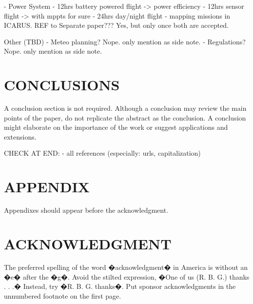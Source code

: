 \documentclass[letterpaper, 10 pt, conference]{ieeeconf}  %
\begin{document}
  - Power System
  - 12hrs battery powered flight -> power efficiency
  - 12hrs sensor flight -> with mppts for sure
  - 24hrs day/night flight
  - mapping missions in ICARUS. REF to Separate paper??? Yes, but only once both are accepted.
    
 Other (TBD)
  - Meteo planning? Nope. only mention as side note.
  - Regulations? Nope. only mention as side note.
   
\section{CONCLUSIONS}

A conclusion section is not required. Although a conclusion may review the main points of the paper, do not replicate the abstract as the conclusion. A conclusion might elaborate on the importance of the work or suggest applications and extensions. 

CHECK AT END:
 - all references (especially: urls, capitalization)

\addtolength{\textheight}{-12cm}   %







\section*{APPENDIX}

Appendixes should appear before the acknowledgment.

\section*{ACKNOWLEDGMENT}

The preferred spelling of the word �acknowledgment� in America is without an �e� after the �g�. Avoid the stilted expression, �One of us (R. B. G.) thanks . . .�  Instead, try �R. B. G. thanks�. Put sponsor acknowledgments in the unnumbered footnote on the first page.




\end{document}

